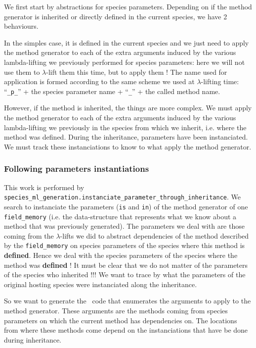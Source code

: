 We first start by abstractions for species parameters. Depending on if
the method generator is inherited or directly defined in the current
species, we have 2 behaviours.

In the simples case, it is defined in the current species and we just
need to apply the method generator to each of the extra arguments
induced by the various lambda-lifting we previously performed for
species parameters: here we will not use them to $\lambda$-lift them
this time, but to apply them ! The name used for application is formed
according to the same scheme we used at $\lambda$-lifting time:
``{\tt \_p\_}'' + the species parameter name + ``{\tt \_}'' + the
called method name.

However, if the method is inherited, the things are more complex. We
must apply the method generator to each of the extra arguments induced
by the various lambda-lifting we previously in the species from which
we inherit, i.e. where the method was defined. During the inheritance,
parameters have been instanciated. We must track these instanciations
to know to what apply the method generator.


\subsubsection{Following parameters instantiations}
This work is performed by
{\tt species\_ml\_generation.instanciate\_parameter\_through\_inheritance}.
We search to instanciate the parameters ({\tt is} and {\tt in}) of the
method generator of one {\tt field\_memory} (i.e. the data-structure that
represents what we know about a method that was previously
generated). The parameters we deal with are those coming from the
$\lambda$-lifts we did to abstract dependencies of the method
described by the {\tt field\_memory} on species parameters of the species
where this method is {\bf defined}.
Hence we deal with the species parameters of the species where the
method was {\bf defined} ! It must be clear that we do not matter of
the parameters of the species who inherited !!! We want to trace by
what the parameters of the original hosting species were instanciated
along the inheritance.

So we want to generate the \ocaml\ code that enumerates the arguments to
apply to the method generator. These arguments are the methods coming
from species parameters on which the current method has dependencies
on. The locations from where these methods come depend on the
instanciations that have be done during inheritance.

